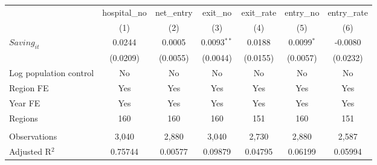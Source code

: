 \begingroup
\centering
\begin{tabular}{lcccccc}
   \toprule
                          & hospital\_no  & net\_entry  & exit\_no      & exit\_rate  & entry\_no    & entry\_rate \\    
                          & (1)           & (2)         & (3)           & (4)         & (5)          & (6)\\  
   \midrule 
   $Saving_{it}$          & 0.0244        & 0.0005      & 0.0093$^{**}$ & 0.0188      & 0.0099$^{*}$ & -0.0080\\   
                          & (0.0209)      & (0.0055)    & (0.0044)      & (0.0155)    & (0.0057)     & (0.0232)\\   
   Log population control & No            & No          & No            & No          & No           & No\\  
   Region FE              & Yes           & Yes         & Yes           & Yes         & Yes          & Yes\\  
   Year FE                & Yes           & Yes         & Yes           & Yes         & Yes          & Yes\\  
   Regions                & 160           & 160         & 160           & 151         & 160          & 151\\  
    \\
   Observations           & 3,040         & 2,880       & 3,040         & 2,730       & 2,880        & 2,587\\  
   Adjusted R$^2$         & 0.75744       & 0.00577     & 0.09879       & 0.04795     & 0.06199      & 0.05994\\  
   \bottomrule
\end{tabular}
\par\endgroup
